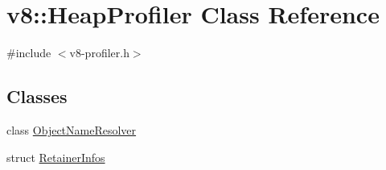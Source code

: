 \hypertarget{classv8_1_1HeapProfiler}{}\section{v8\+:\+:Heap\+Profiler Class Reference}
\label{classv8_1_1HeapProfiler}


{\ttfamily \#include $<$v8-\/profiler.\+h$>$}

\subsection*{Classes}
\begin{DoxyCompactItemize}
\item 
class \mbox{\hyperlink{classv8_1_1HeapProfiler_1_1ObjectNameResolver}{Object\+Name\+Resolver}}
\item 
struct \mbox{\hyperlink{structv8_1_1HeapProfiler_1_1RetainerInfos}{Retainer\+Infos}}
\end{DoxyCompactItemize}
